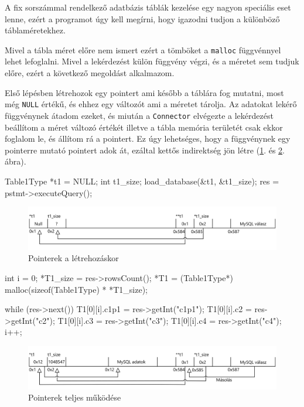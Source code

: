 
A fix sorszámmal rendelkező adatbázis táblák kezelése egy nagyon speciális eset lenne, ezért a programot úgy kell megírni, hogy igazodni tudjon a különböző táblaméretekhez.

Mivel a tábla méret előre nem ismert ezért a tömböket a \texttt{malloc} függvénnyel lehet lefoglalni. Mivel a lekérdezést külön függvény végzi, és a méretet sem tudjuk előre, ezért a következő megoldást alkalmazom.

Első lépésben létrehozok egy pointert ami később a táblára fog mutatni, most még \texttt{NULL} értékű, és ehhez egy változót ami a méretet tárolja. Az adatokat lekérő függvénynek átadom ezeket, és miután a \texttt{Connector} elvégezte a lekérdezést beállítom a méret változó értékét illetve a tábla memória területét csak ekkor foglalom le, és állítom rá a pointert. Ez úgy lehetséges, hogy a függvénynek egy pointerre mutató pointert adok át, ezáltal kettős indirektség jön létre (\ref{fig:pointer_01}. és \ref{fig:pointer_02}. ábra).

\begin{cpp}
Table1Type *t1 = NULL;
int t1_size;
load_database(&t1, &t1_size);
res = pstmt->executeQuery();
\end{cpp}
\begin{figure}[h!]
\centering
\includegraphics[width=\textwidth]{images/implementation/pointer_01.png}
\caption{Pointerek a létrehozáskor}
\label{fig:pointer_01}
\end{figure}
\begin{cpp}
int i = 0;
*T1_size = res->rowsCount();
*T1 = (Table1Type*) malloc(sizeof(Table1Type) * *T1_size);

while (res->next()) {
    T1[0][i].c1p1 = res->getInt("c1p1");
    T1[0][i].c2 = res->getInt("c2");
    T1[0][i].c3 = res->getInt("c3");
    T1[0][i].c4 = res->getInt("c4");
    i++;
}
\end{cpp}

\begin{figure}[h!]
\centering
\includegraphics[width=\textwidth]{images/implementation/pointer_02.png}
\caption{Pointerek teljes működése}
\label{fig:pointer_02}
\end{figure}

